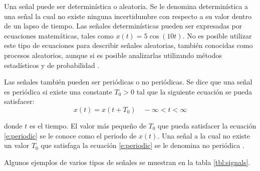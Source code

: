 Una se\~nal puede ser determin\'istica o aleatoria. Se le denomina
determin\'istica a una se\~nal la cual no existe ninguna incertidumbre con
respecto a su valor dentro de un lapso de tiempo. Las se\~nales
determin\'isticas pueden ser expresadas por ecuaciones matem\'aticas, tales como
$x(t)=5\cos(10t)$. No es posible utilizar este tipo de ecuaciones para describir
se\~nales aleatorias, tambi\'en conocidas como procesos aleatorios, aunque si 
es posible analizarlas utilizando m\'etodos estad\'isticos y de probabilidad
\cite{sklar}.

Las se\~nales tambi\'en pueden ser peri\'odicas o no peri\'odicas. Se dice que
una se\~nal es peri\'odica si existe una constante $T_0 > 0$ tal que la
siguiente ecuaci\'on se pueda satisfacer:
\begin{equation}\label{e:periodic}
x(t)=x(t+T_0) \quad   -\infty<t<\infty
\end{equation}

donde $t$ es el tiempo. El valor m\'as peque\~no de $T_0$ que pueda satisfacer
la ecuaci\'on \eqref{e:periodic} se le conoce como el periodo de $x(t)$. Una
se\~nal a la cual no existe un valor $T_0$ que satisfaga la ecuaci\'on
\eqref{e:periodic} se le denomina no peri\'odica \cite{sklar}.

Algunos ejemplos de varios tipos de se\~nales se muestran en la tabla
\ref{tbl:signals}.

